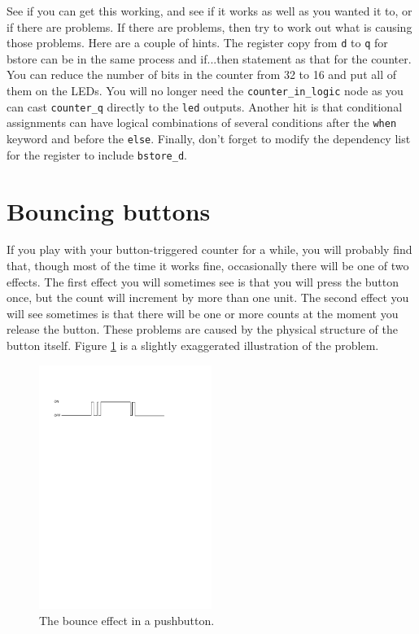 \documentclass[../physical_computing.tex]{subfiles}
\begin{document}
See if you can get this working, and see if it works as well as you wanted it to, or if there are problems. If there are problems, then try to work out what is causing those problems. Here are a couple of hints. The register copy from \texttt{d} to \texttt{q} for bstore can be in the same process and if...then statement as that for the counter. You can reduce the number of bits in the counter from 32 to 16 and put all of them on the LEDs. You will no longer need the \texttt{counter\_in\_logic} node as you can cast \texttt{counter\_q} directly to the \texttt{led} outputs. Another hit is that conditional assignments can have logical combinations of several conditions after the \texttt{when} keyword and before the \texttt{else}. Finally, don't forget to modify the dependency list for the register to include \texttt{bstore\_d}.

\section{Bouncing buttons}
\label{sec:bounce}

If you play with your button-triggered counter for a while, you will probably find that, though most of the time it works fine, occasionally there will be one of two effects. The first effect you will sometimes see is that you will press the button once, but the count will increment by more than one unit. The second effect you will see sometimes is that there will be one or more counts at the moment you release the button. These problems are caused by the physical structure of the button itself. Figure \ref{fig:button} is a slightly exaggerated illustration of the problem.

\begin{figure}[htbp]
    \centering
    \includegraphics[width=0.5\textwidth]{figures/button.pdf}
    \caption{The bounce effect in a pushbutton.}
    \label{fig:button}
\end{figure}
\end{document}
